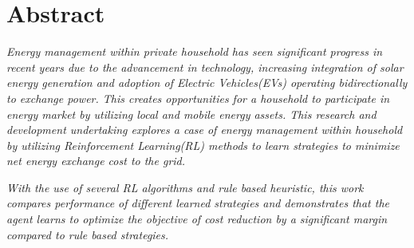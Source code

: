 \chapter*{ \centering Abstract} 

\vspace*{5\baselineskip}

\begin{large}
\centering
\textit{Energy management within private household has seen significant progress in recent years due to the advancement in technology, increasing integration of solar energy generation and adoption of Electric Vehicles(EVs) operating bidirectionally to exchange power. This creates opportunities for a household to participate in energy market by utilizing local and mobile energy assets. This research and development undertaking explores a case of energy management within household by utilizing Reinforcement Learning(RL) methods to learn strategies to minimize net energy exchange cost to the grid.}

\vspace*{1\baselineskip}

\textit{With the use of several RL algorithms and rule based heuristic, this work compares performance of different learned strategies and demonstrates that the agent learns to optimize the objective of cost reduction by a significant margin compared to rule based strategies.}

\end{large}


